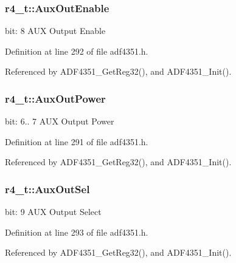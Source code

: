 \subsubsection[{\texorpdfstring{Aux\+Out\+Enable}{AuxOutEnable}}]{ r4\+\_\+t\+::\+Aux\+Out\+Enable}\hypertarget{structr4__t_ab6c43ed3da1189c3de8cf2cafafb03f3}{}\label{structr4__t_ab6c43ed3da1189c3de8cf2cafafb03f3}
bit\+: 8 A\+UX Output Enable 

Definition at line 292 of file adf4351.\+h.



Referenced by A\+D\+F4351\+\_\+\+Get\+Reg32(), and A\+D\+F4351\+\_\+\+Init().

\subsubsection[{\texorpdfstring{Aux\+Out\+Power}{AuxOutPower}}]{ r4\+\_\+t\+::\+Aux\+Out\+Power}\hypertarget{structr4__t_a92b00824868c7911a73217cbdd48ca96}{}\label{structr4__t_a92b00824868c7911a73217cbdd48ca96}
bit\+: 6.. 7 A\+UX Output Power 

Definition at line 291 of file adf4351.\+h.



Referenced by A\+D\+F4351\+\_\+\+Get\+Reg32(), and A\+D\+F4351\+\_\+\+Init().

\subsubsection[{\texorpdfstring{Aux\+Out\+Sel}{AuxOutSel}}]{ r4\+\_\+t\+::\+Aux\+Out\+Sel}\hypertarget{structr4__t_af75cec4d15f4f2e086db3be6d4c3c215}{}\label{structr4__t_af75cec4d15f4f2e086db3be6d4c3c215}
bit\+: 9 A\+UX Output Select 

Definition at line 293 of file adf4351.\+h.



Referenced by A\+D\+F4351\+\_\+\+Get\+Reg32(), and A\+D\+F4351\+\_\+\+Init().

